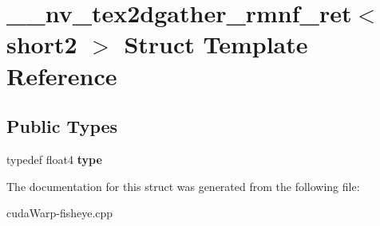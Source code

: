 \hypertarget{struct____nv__tex2dgather__rmnf__ret_3_01short2_01_4}{}\section{\+\_\+\+\_\+nv\+\_\+tex2dgather\+\_\+rmnf\+\_\+ret$<$ short2 $>$ Struct Template Reference}
\label{struct____nv__tex2dgather__rmnf__ret_3_01short2_01_4}
\subsection*{Public Types}
\begin{DoxyCompactItemize}
\item 
typedef float4 {\bfseries type}\hypertarget{struct____nv__tex2dgather__rmnf__ret_3_01short2_01_4_a14648a70b31a597536d03bc7b931b2cb}{}\label{struct____nv__tex2dgather__rmnf__ret_3_01short2_01_4_a14648a70b31a597536d03bc7b931b2cb}

\end{DoxyCompactItemize}


The documentation for this struct was generated from the following file\+:\begin{DoxyCompactItemize}
\item 
cuda\+Warp-\/fisheye.\+cpp\end{DoxyCompactItemize}
